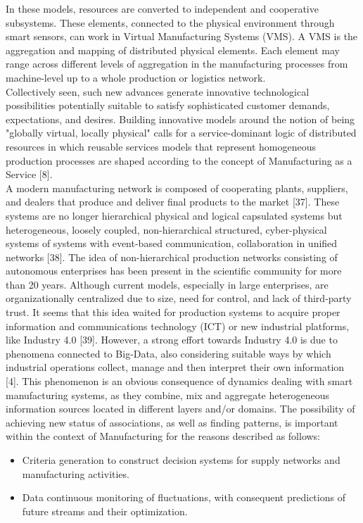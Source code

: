 In these models, resources are converted to independent and cooperative subsystems. These elements, connected to the physical environment through smart sensors, can work in Virtual Manufacturing Systems (VMS). A VMS is the aggregation and mapping of distributed physical elements. Each element may range across different levels of aggregation in the manufacturing processes from machine-level up to a whole production or logistics network.\\
Collectively seen, such new advances generate innovative technological possibilities potentially suitable to satisfy sophisticated customer demands, expectations, and desires. Building innovative models around the notion of being "globally virtual, locally physical" calls for a service-dominant logic of distributed resources in which reusable services models that represent homogeneous production processes are shaped according to the concept of Manufacturing as a Service [8].\\
A modern manufacturing network is composed of cooperating plants, suppliers, and dealers that produce and deliver final products to the market [37]. These systems are no longer hierarchical physical and logical capsulated systems but heterogeneous, loosely coupled, non-hierarchical structured, cyber-physical systems of systems with event-based communication, collaboration in unified networks [38]. The idea of non-hierarchical production networks consisting of autonomous enterprises has been present in the scientific community for more than 20 years. Although current models, especially in large enterprises, are organizationally centralized due to size, need for control, and lack of third-party trust. It seems that this idea waited for production systems to acquire proper information and communications technology (ICT) or new industrial platforms, like Industry 4.0 [39]. However, a strong effort towards Industry 4.0 is due to phenomena connected to Big-Data, also considering suitable ways by which industrial operations collect, manage and then interpret their own information [4]. This phenomenon is an obvious consequence of dynamics dealing with smart manufacturing systems, as they combine, mix and aggregate heterogeneous information sources located in different layers and/or domains. The possibility of achieving new status of associations, as well as finding patterns, is important within the context of Manufacturing for the reasons described as follows:
\begin{itemize}
    \item Criteria generation to construct decision systems for supply networks and manufacturing activities.
    \item Data continuous monitoring of fluctuations, with consequent predictions of future streams and their optimization.
\end{itemize}
